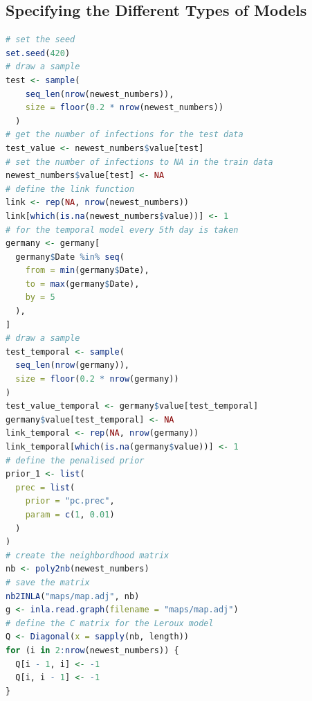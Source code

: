 \subsection{Specifying the Different Types of Models}
\begin{lstlisting}[caption={Specifying different models in INLA.}, label={codeModels}, language=R]
# set the seed
set.seed(420)
# draw a sample
test <- sample(
    seq_len(nrow(newest_numbers)),
    size = floor(0.2 * nrow(newest_numbers))
  )
# get the number of infections for the test data
test_value <- newest_numbers$value[test]
# set the number of infections to NA in the train data
newest_numbers$value[test] <- NA
# define the link function
link <- rep(NA, nrow(newest_numbers))
link[which(is.na(newest_numbers$value))] <- 1
# for the temporal model every 5th day is taken
germany <- germany[
  germany$Date %in% seq(
    from = min(germany$Date),
    to = max(germany$Date),
    by = 5
  ),
]
# draw a sample
test_temporal <- sample(
  seq_len(nrow(germany)),
  size = floor(0.2 * nrow(germany))
)
test_value_temporal <- germany$value[test_temporal]
germany$value[test_temporal] <- NA
link_temporal <- rep(NA, nrow(germany))
link_temporal[which(is.na(germany$value))] <- 1
# define the penalised prior
prior_1 <- list(
  prec = list(
    prior = "pc.prec",
    param = c(1, 0.01)
  )
)
# create the neighbordhood matrix
nb <- poly2nb(newest_numbers)
# save the matrix
nb2INLA("maps/map.adj", nb)
g <- inla.read.graph(filename = "maps/map.adj")
# define the C matrix for the Leroux model
Q <- Diagonal(x = sapply(nb, length))
for (i in 2:nrow(newest_numbers)) {
  Q[i - 1, i] <- -1
  Q[i, i - 1] <- -1
}


\end{lstlisting}
